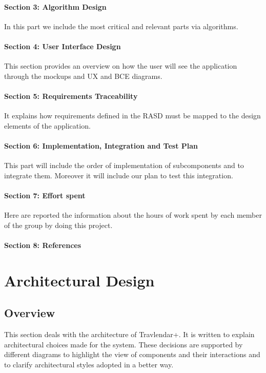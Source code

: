 \documentclass[12pt,titlepage]{article}
\begin{document}
\paragraph{Section 3: Algorithm Design}
In this part we include the most critical and relevant parts via algorithms.
\paragraph{Section 4: User Interface Design}
This section provides an overview on how the user will see the application through the mockups and UX and BCE diagrams.
\paragraph{Section 5: Requirements Traceability}
It explains how requirements defined in the RASD must be mapped to the design elements of the application.
\paragraph{Section 6: Implementation, Integration and Test Plan}
This part will include the order of implementation of subcomponents and to integrate them. Moreover it will include our plan to test this integration.
\paragraph{Section 7: Effort spent}
Here are reported the information about the hours of work spent by each member of the group by doing this project.
\paragraph{Section 8: References}

\section{Architectural Design}
\subsection{Overview}
This section deals with the architecture of Travlendar+. It is written to explain architectural choices made for the system. These decisions are supported by different diagrams to highlight the view of components and their interactions and to clarify architectural styles adopted in a better way.
\end{document}
